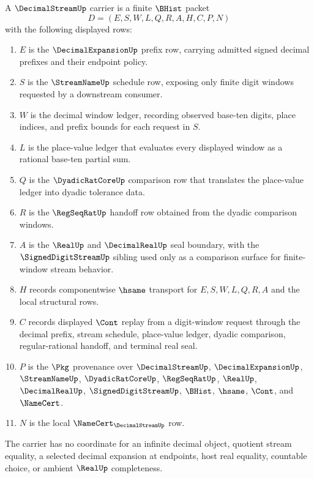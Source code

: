 \begin{definition}
\label{def:decimal-stream-carrier}
A $\DecimalStreamUp$ carrier is a finite $\BHist$ packet
$$
D=(E,S,W,L,Q,R,A,H,C,P,N)
$$
with the following displayed rows:
\begin{enumerate}
\item $E$ is the $\DecimalExpansionUp$ prefix row, carrying admitted signed decimal prefixes and their endpoint policy.
\item $S$ is the $\StreamNameUp$ schedule row, exposing only finite digit windows requested by a downstream consumer.
\item $W$ is the decimal window ledger, recording observed base-ten digits, place indices, and prefix bounds for each request in $S$.
\item $L$ is the place-value ledger that evaluates every displayed window as a rational base-ten partial sum.
\item $Q$ is the $\DyadicRatCoreUp$ comparison row that translates the place-value ledger into dyadic tolerance data.
\item $R$ is the $\RegSeqRatUp$ handoff row obtained from the dyadic comparison windows.
\item $A$ is the $\RealUp$ and $\DecimalRealUp$ seal boundary, with the $\SignedDigitStreamUp$ sibling used only as a comparison surface for finite-window stream behavior.
\item $H$ records componentwise $\hsame$ transport for $E,S,W,L,Q,R,A$ and the local structural rows.
\item $C$ records displayed $\Cont$ replay from a digit-window request through the decimal prefix, stream schedule, place-value ledger, dyadic comparison, regular-rational handoff, and terminal real seal.
\item $P$ is the $\Pkg$ provenance over $\DecimalStreamUp$, $\DecimalExpansionUp$, $\StreamNameUp$, $\DyadicRatCoreUp$, $\RegSeqRatUp$, $\RealUp$, $\DecimalRealUp$, $\SignedDigitStreamUp$, $\BHist$, $\hsame$, $\Cont$, and $\NameCert$.
\item $N$ is the local $\NameCert_{\DecimalStreamUp}$ row.
\end{enumerate}
The carrier has no coordinate for an infinite decimal object, quotient stream equality, a selected decimal expansion at endpoints, host real equality, countable choice, or ambient $\RealUp$ completeness.
\end{definition}

